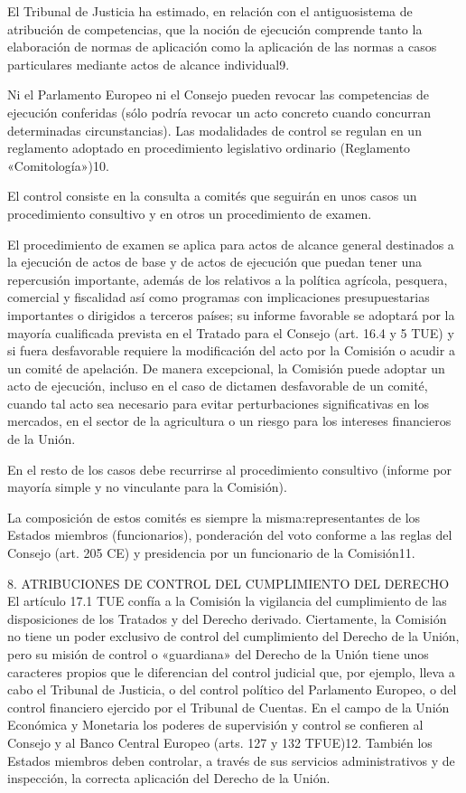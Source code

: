 \documentclass[10pt,a4paper]{article}
\begin{document}
El Tribunal de Justicia ha estimado, en relación con el antiguosistema de atribución de competencias, que la noción de ejecución comprende tanto la elaboración de normas de aplicación como la aplicación de las normas a casos particulares mediante actos de alcance individual9.

Ni el Parlamento Europeo ni el Consejo pueden revocar las competencias de ejecución conferidas (sólo podría revocar un acto concreto cuando concurran determinadas circunstancias). Las modalidades de control se regulan en un reglamento adoptado en procedimiento legislativo ordinario (Reglamento «Comitología»)10.

El control consiste en la consulta a comités que seguirán en unos casos un procedimiento consultivo y en otros un procedimiento de examen.

El procedimiento de examen se aplica para actos de alcance general destinados a la ejecución de actos de base y de actos de ejecución que puedan tener una repercusión importante, además de los relativos a la política agrícola, pesquera, comercial y fiscalidad así como programas con implicaciones presupuestarias importantes o dirigidos a terceros países; su informe favorable se adoptará por la mayoría cualificada prevista en el Tratado para el Consejo (art. 16.4 y 5 TUE) y si fuera desfavorable requiere la modificación del acto por la Comisión o acudir a un comité de apelación. De manera excepcional, la Comisión puede adoptar un acto de ejecución, incluso en el caso de dictamen desfavorable de un comité, cuando tal acto sea necesario para evitar perturbaciones significativas en los mercados, en el sector de la agricultura o un riesgo para los intereses financieros de la Unión.

En el resto de los casos debe recurrirse al procedimiento consultivo (informe por mayoría simple y no vinculante para la Comisión).

La composición de estos comités es siempre la misma:representantes de los Estados miembros (funcionarios), ponderación del voto conforme a las reglas del Consejo (art. 205 CE) y presidencia por un funcionario de la Comisión11.



8. ATRIBUCIONES DE CONTROL DEL CUMPLIMIENTO DEL DERECHO
El artículo 17.1 TUE confía a la Comisión la vigilancia del cumplimiento de las disposiciones de los Tratados y del Derecho derivado. Ciertamente, la Comisión no tiene un poder exclusivo de control del cumplimiento del Derecho de la Unión, pero su misión de control o «guardiana» del Derecho de la Unión tiene unos caracteres propios que le diferencian del control judicial que, por ejemplo, lleva a cabo el Tribunal de Justicia, o del control político del Parlamento Europeo, o del control financiero ejercido por el Tribunal de Cuentas. En el campo de la Unión Económica y Monetaria los poderes de supervisión y control se confieren al Consejo y al Banco Central Europeo (arts. 127 y 132 TFUE)12. También los Estados miembros deben controlar, a través de sus servicios administrativos y de inspección, la correcta aplicación del Derecho de la Unión.
\end{document}
